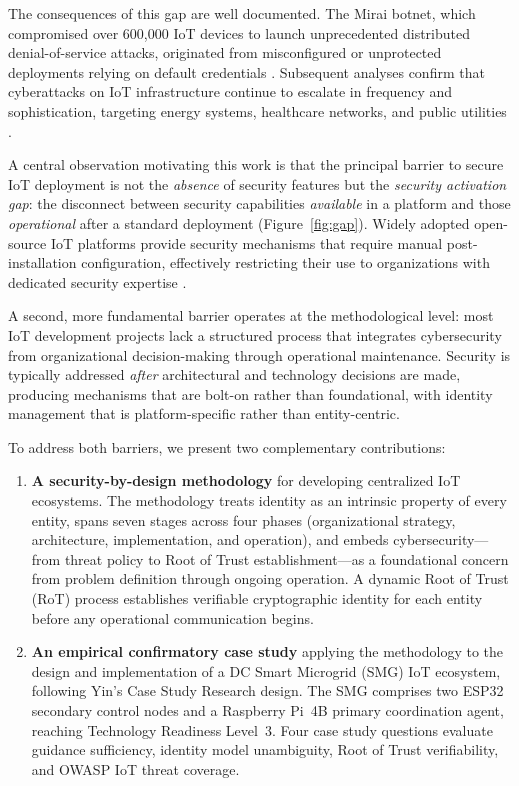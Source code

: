 \documentclass[preprint,12pt,authoryear]{elsarticle}
\begin{document}
The consequences of this gap are well documented. The Mirai botnet, which compromised over 600,000 IoT devices to launch unprecedented distributed denial-of-service attacks, originated from misconfigured or unprotected deployments relying on default credentials \citep{Mirai_analysis_2017}. Subsequent analyses confirm that cyberattacks on IoT infrastructure continue to escalate in frequency and sophistication, targeting energy systems, healthcare networks, and public utilities \citep{abraham2025cyber, okika2025addressing}.

A central observation motivating this work is that the principal barrier to secure IoT deployment is not the \emph{absence} of security features but the \emph{security activation gap}: the disconnect between security capabilities \emph{available} in a platform and those \emph{operational} after a standard deployment (Figure~\ref{fig:gap}). Widely adopted open-source IoT platforms provide security mechanisms that require manual post-installation configuration, effectively restricting their use to organizations with dedicated security expertise \citep{NIST_IoT_2020}.

A second, more fundamental barrier operates at the methodological level: most IoT development projects lack a structured process that integrates cybersecurity from organizational decision-making through operational maintenance. Security is typically addressed \emph{after} architectural and technology decisions are made, producing mechanisms that are bolt-on rather than foundational, with identity management that is platform-specific rather than entity-centric.

To address both barriers, we present two complementary contributions:

\begin{enumerate}
    \item \textbf{A security-by-design methodology} for developing centralized IoT ecosystems. The methodology treats identity as an intrinsic property of every entity, spans seven stages across four phases (organizational strategy, architecture, implementation, and operation), and embeds cybersecurity---from threat policy to Root of Trust establishment---as a foundational concern from problem definition through ongoing operation. A dynamic Root of Trust (RoT) process establishes verifiable cryptographic identity for each entity before any operational communication begins.

    \item \textbf{An empirical confirmatory case study} applying the methodology to the design and implementation of a DC Smart Microgrid (SMG) IoT ecosystem, following Yin's \citeyearpar{yin2014case} Case Study Research design. The SMG comprises two ESP32 secondary control nodes and a Raspberry Pi~4B primary coordination agent, reaching Technology Readiness Level~3. Four case study questions evaluate guidance sufficiency, identity model unambiguity, Root of Trust verifiability, and OWASP IoT threat coverage.
\end{enumerate}
\end{document}
